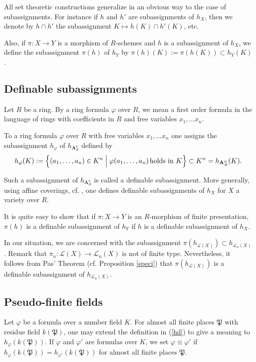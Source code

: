 \documentclass[english,12pt]{amsart}
\let\got\mathfrak
\def\gP{{\got P}}
\def\AA{{\mathbf A}}
\def\cL{{\mathcal L}}
\theoremstyle{definition}
\theoremstyle{remark}
\theoremstyle{plain}
\numberwithin{equation}{subsection}
\let\got\mathfrak
\def\AA{{\mathbf A}}
\def\cL{{\mathcal L}}
\begin{document}
All set theoretic constructions generalize in an obvious
way to the case of subassignments. For instance if $h$ and $h'$
are subassignments of $h_X$, then we denote by
$h \cap h'$ the subassignment $K \mapsto h (K) \cap h' (K)$, etc.


Also, if $\pi : X \rightarrow Y$ is a morphism
of $R$-schemes and $h$ is a 
subassignment of $h_X$, we define
the 
subassignment $\pi (h)$ of 
$h_Y$ by $\pi (h) (K) := \pi (h (K)) \subset h_Y (K)$.

\subsection{Definable subassignments}Let $R$
be a ring. 
By a ring formula $\varphi$  over $R$, we mean
a first order formula in the language of rings with coefficients
in $R$ and free variables $x_1, \dots x_n$.


To a  ring formula $\varphi$ over $R$ with
free variables $x_1, \dots x_n$
one assigns the subassignment $h_{\varphi}$
of $h_{\AA^n_R}$ defined by
\begin{equation}\label{hd}
h_{\varphi}( K) :=
\Bigl\{ (a_1, \dots, a_n) \in K^n\Bigm \vert
\varphi (a_1, \dots, a_n) \, \textrm{holds in } K \Bigr\} \subset
K^n = h_{\AA^n_R} (K).
\end{equation}


Such a subassignment 
of $h_{\AA^n_R}$ is called a definable subassignment.
More generally, using affine coverings, cf. \cite{def}, one defines 
definable subassignments of $h_X$ for $X$ a variety over $R$.



It is quite easy to show that if $\pi : X \rightarrow Y$
is an $R$-morphism of finite presentation,
$\pi (h)$ is a definable subassignment of $h_Y$
if $h$ is a definable subassignment of $h_X$.



In our situation, we are concerned with the
subassignment
$\pi (h_{\cL (X)}) \subset h_{\cL_n (X)}$.
Remark that
$\pi_n : \cL (X) \rightarrow \cL_n (X)$ is not of finite type.
Nevertheless, it follows from Pas' Theorem (cf. Proposition \ref{speci})
that
$\pi (h_{\cL (X)})$  is a definable subassignment of $h_{\cL_n (X)}$.


\subsection{Pseudo-finite fields}Let $\varphi$ be a formula over a number field $K$.
For almost all finite places $\gP$ with residue field
$k (\gP)$, one may extend the definition in
(\ref{hd}) to give a meaning
to $h_{\varphi}(k (\gP))$.
If $\varphi$ and $\varphi'$ are formulas over $K$,
we set $\varphi \equiv \varphi'$
if $h_{\varphi}(k (\gP)) =
h_{\varphi'}(k (\gP))$
for almost all finite places $\gP$.
\end{document}
